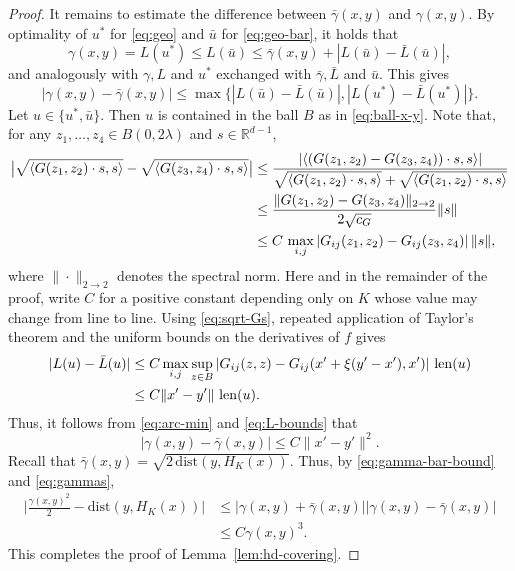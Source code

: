 \documentclass[a4paper,12pt,reqno]{amsart}
\theoremstyle{definition}
\newcommand{\IR}{\mathbb{R}}
\newcommand{\dist}{\mathrm{dist}}
\DeclareMathOperator{\len}{len}
\begin{document}
\begin{proof}
It remains to estimate the difference between $\bar{\gamma}(x,y)$ and $\gamma(x,y)$. By optimality of $u^*$ for \eqref{eq:geo} and $\bar{u}$ for \eqref{eq:geo-bar}, it holds that
\[
\gamma(x,y)
=L(u^*)
\le L(\bar{u}) 
\le \bar{\gamma}(x,y) + |L(\bar{u})-\bar{L}(\bar{u})|,
\]
and analogously with $\gamma, L$ and $u^*$ exchanged with $\bar{\gamma},\bar{L}$ and $\bar{u}$. This gives
\begin{equation} \label{eq:L-bounds}
|\gamma(x,y)-\bar{\gamma}(x,y)|
\le \max\big\{|L(\bar{u})-\bar{L}(\bar{u})|,|L(u^*)-\bar{L}(u^*)|\big\}.
\end{equation}
Let $u\in \{u^*,\bar{u}\}$. Then $u$ is contained in the ball $B$ as in \eqref{eq:ball-x-y}. Note that, for any $z_1,\dots,z_4\in B(0,2\lambda)$ and $s\in \IR^{d-1}$,
\begin{align}\label{eq:sqrt-Gs}
	\big|\sqrt{\langle G(z_1,z_2)\cdot s,s\rangle} -\sqrt{\langle G(z_3,z_4)\cdot s,s\rangle}\big|
	&\le \frac{|\langle (G(z_1,z_2)-G(z_3,z_4))\cdot s,s\rangle|}{\sqrt{\langle G(z_1,z_2)\cdot s,s\rangle} +\sqrt{\langle G(z_1,z_2)\cdot s,s\rangle}}\notag\\
	&\le \frac{\|G(z_1,z_2)-G(z_3,z_4)\|_{2\to 2}}{2\sqrt{c_G}}\|s\|\notag\\
	&\le C\, \max_{i,j}|G_{ij}(z_1,z_2)-G_{ij}(z_3,z_4)|\,\|s\|,
\end{align}
where $\|\cdot\|_{2\to 2}$ denotes the spectral norm. Here and in the remainder of the proof, write $C$ for a positive constant depending only on $K$ whose value may change from line to line.  Using \eqref{eq:sqrt-Gs}, repeated application of Taylor's theorem and the uniform bounds on the derivatives of $f$ gives
\begin{align*}
|L(u)-\bar{L}(u)|
&\le C \max_{i,j}\sup_{z\in B}|G_{ij}(z,z)-G_{ij}(x'+\xi(y'-x'),x')|\,\len(u)\notag\\
&\le C\|x'-y'\|\,\len(u).
\end{align*}
Thus, it follows from \eqref{eq:arc-min} and \eqref{eq:L-bounds} that
\begin{equation}\label{eq:gammas}
	|\gamma(x,y)-\bar{\gamma}(x,y)|
	\le C \|x'-y'\|^2.
\end{equation}
Recall that $\bar{\gamma}(x,y)=\sqrt{2\,\dist(y,H_K(x))}$. Thus, by \eqref{eq:gamma-bar-bound} and \eqref{eq:gammas},
\begin{align*}
\Big|\frac{\gamma(x,y)^2}{2}-\dist(y,H_K(x))\Big|
&\le |\gamma(x,y)+\bar{\gamma}(x,y)||\gamma(x,y)-\bar{\gamma}(x,y)|\\
&\le C \gamma(x,y)^3.
\end{align*}
This completes the proof of Lemma~\ref{lem:hd-covering}.
\end{proof}
\end{document}
